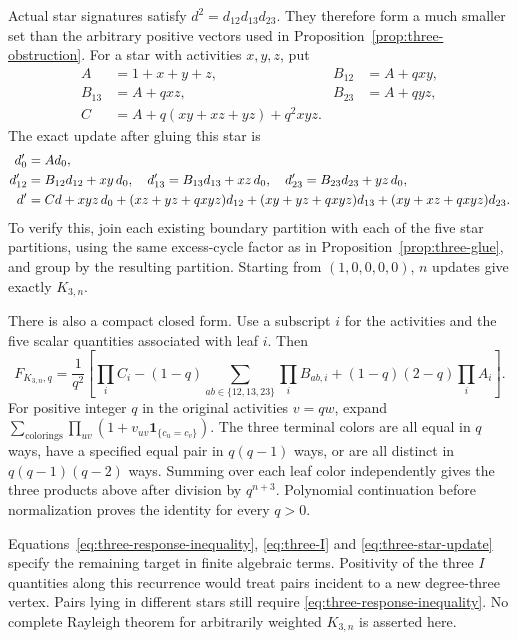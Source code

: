 \documentclass[11pt,a4paper]{article}
\theoremstyle{definition}
\theoremstyle{remark}\newtheorem{remark}[theorem]{Remark}
\begin{document}
Actual star signatures satisfy $d^2=d_{12}d_{13}d_{23}$.
They therefore form a much smaller set than the arbitrary positive
vectors used in Proposition~\ref{prop:three-obstruction}.
For a star with activities $x,y,z$, put
\begin{align*}
 A&=1+x+y+z, &
 B_{12}&=A+qxy,\\
 B_{13}&=A+qxz, &
 B_{23}&=A+qyz,\\
 C&=A+q(xy+xz+yz)+q^2xyz.
\end{align*}
The exact update after gluing this star is
\begin{align}
 d'_0&=Ad_0,\notag\\
 d'_{12}&=B_{12}d_{12}+xy\,d_0,\quad
 d'_{13}=B_{13}d_{13}+xz\,d_0,\quad
 d'_{23}=B_{23}d_{23}+yz\,d_0,\notag\\
 d'&=Cd+xyz\,d_0
 +(xz+yz+qxyz)d_{12}
 +(xy+yz+qxyz)d_{13}
 +(xy+xz+qxyz)d_{23}.
 \label{eq:three-star-update}
\end{align}
To verify this, join each existing boundary partition with each of the
five star partitions, using the same excess-cycle factor as in
Proposition~\ref{prop:three-glue}, and group by the resulting partition.
Starting from $(1,0,0,0,0)$, $n$ updates give exactly $K_{3,n}$.

There is also a compact closed form. Use a subscript $i$ for the
activities and the five scalar quantities associated with leaf $i$.
Then
\begin{equation}\label{eq:three-bipartite}
 F_{K_{3,n},q}
 =\frac1{q^2}\left[
 \prod_i C_i
 -(1-q)\sum_{ab\in\{12,13,23\}}\prod_i B_{ab,i}
 +(1-q)(2-q)\prod_i A_i
 \right].
\end{equation}
For positive integer $q$ in the original activities $v=qw$, expand
$\sum_{\text{colorings}}\prod_{uv}(1+v_{uv}\mathbf1_{\{c_u=c_v\}})$.
The three terminal colors are all equal in $q$ ways, have a specified
equal pair in $q(q-1)$ ways, or are all distinct in
$q(q-1)(q-2)$ ways. Summing over each leaf color independently
gives the three products above after division by $q^{n+3}$.
Polynomial continuation before normalization proves the identity for
every $q>0$.

Equations~\eqref{eq:three-response-inequality},
\eqref{eq:three-I} and \eqref{eq:three-star-update} specify the remaining
target in finite algebraic terms. Positivity of the three $I$ quantities
along this recurrence would treat pairs incident to a new degree-three
vertex. Pairs lying in different stars still require
\eqref{eq:three-response-inequality}. No complete Rayleigh theorem for
arbitrarily weighted $K_{3,n}$ is asserted here.
\end{document}
